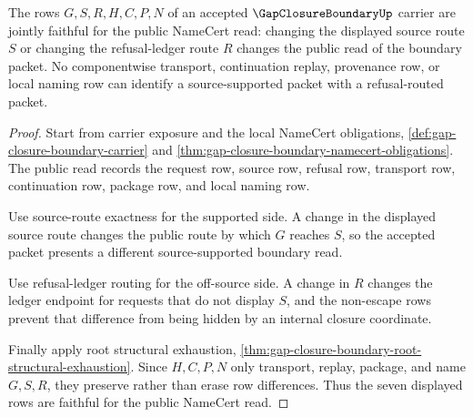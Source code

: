 \begin{theorem}
\label{thm:gap-closure-boundary-field-faithful-row-separation}
The rows $G,S,R,H,C,P,N$ of an accepted $\GapClosureBoundaryUp$ carrier are jointly faithful for the public NameCert read: changing the displayed source route $S$ or changing the refusal-ledger route $R$ changes the public read of the boundary packet. No componentwise transport, continuation replay, provenance row, or local naming row can identify a source-supported packet with a refusal-routed packet.
\end{theorem}
\begin{proof}
Start from carrier exposure and the local NameCert obligations, \autoref{def:gap-closure-boundary-carrier} and \autoref{thm:gap-closure-boundary-namecert-obligations}. The public read records the request row, source row, refusal row, transport row, continuation row, package row, and local naming row.

Use source-route exactness for the supported side. A change in the displayed source route changes the public route by which $G$ reaches $S$, so the accepted packet presents a different source-supported boundary read.

Use refusal-ledger routing for the off-source side. A change in $R$ changes the ledger endpoint for requests that do not display $S$, and the non-escape rows prevent that difference from being hidden by an internal closure coordinate.

Finally apply root structural exhaustion, \autoref{thm:gap-closure-boundary-root-structural-exhaustion}. Since $H,C,P,N$ only transport, replay, package, and name $G,S,R$, they preserve rather than erase row differences. Thus the seven displayed rows are faithful for the public NameCert read.
\end{proof}

